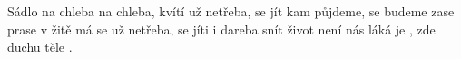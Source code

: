 \begin{TEXT}{Sádlo na chleba}
\SLOKA[]  na chleba, kvítí \NL
{} už netřeba,  se jít \NL
{}kam půjdeme,  se budeme \NL
{} zase   prase v žitě má se \NL
{} už netřeba,  se jíti \NL
{} i dareba  snít \NL
{} život není  \NL
{} nás láká  \NL
{} je ,  zde  \NL
{} duchu  těle . \NL
\end{TEXT}

